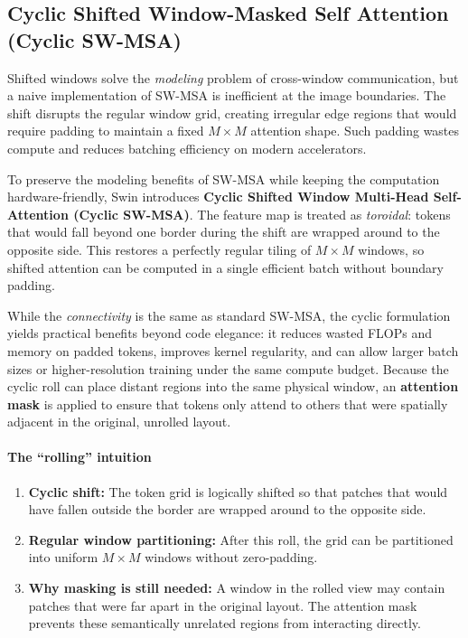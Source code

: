 \subsection{Cyclic Shifted Window-Masked Self Attention (Cyclic SW-MSA)}
\label{subsec:chapter18_cyclic_swmha}

\noindent
Shifted windows solve the \emph{modeling} problem of cross-window communication,
but a naive implementation of SW-MSA is inefficient at the image boundaries.
The shift disrupts the regular window grid,
creating irregular edge regions that would require padding to maintain a fixed \(M \times M\) attention shape.
Such padding wastes compute and reduces batching efficiency on modern accelerators.

\noindent
To preserve the modeling benefits of SW-MSA while keeping the computation hardware-friendly,
Swin introduces \textbf{Cyclic Shifted Window Multi-Head Self-Attention (Cyclic SW-MSA)}.
The feature map is treated as \emph{toroidal}:
tokens that would fall beyond one border during the shift are wrapped around to the opposite side.
This restores a perfectly regular tiling of \(M \times M\) windows,
so shifted attention can be computed in a single efficient batch without boundary padding.

\noindent
While the \emph{connectivity} is the same as standard SW-MSA,
the cyclic formulation yields practical benefits beyond code elegance:
it reduces wasted FLOPs and memory on padded tokens,
improves kernel regularity,
and can allow larger batch sizes or higher-resolution training under the same compute budget.
Because the cyclic roll can place distant regions into the same physical window,
an \textbf{attention mask} is applied to ensure that tokens only attend to others
that were spatially adjacent in the original, unrolled layout.

\paragraph{The ``rolling'' intuition}
\begin{enumerate}
	\item \textbf{Cyclic shift:} The token grid is logically shifted so that patches that would have fallen outside the border are wrapped around to the opposite side.
	\item \textbf{Regular window partitioning:} After this roll, the grid can be partitioned into uniform \(M \times M\) windows without zero-padding.
	\item \textbf{Why masking is still needed:} A window in the rolled view may contain patches that were far apart in the original layout.
	The attention mask prevents these semantically unrelated regions from interacting directly.
\end{enumerate}


